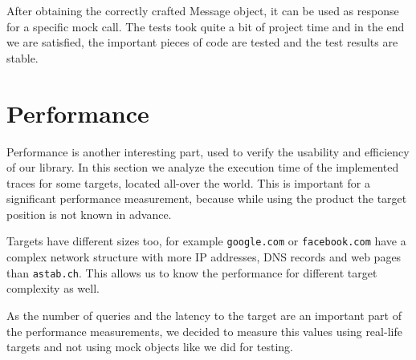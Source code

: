 \documentclass[
	a4paper,					10pt,							twoside,					openright,				notitlepage,			parskip=half,			]{scrreprt}
\begin{document}
After obtaining the correctly crafted Message object, it can be used as response for a specific mock call.
The tests took quite a bit of project time and in the end we are satisfied, the important pieces of code are tested
and the test results are stable.

\section{Performance}
\label{sec:secperf_performance}

Performance is another interesting part, used to verify the usability and efficiency of our library.
In this section we analyze the execution time of the implemented traces for some targets, located all-over the world. 
This is important for a significant performance measurement, because while using the product the target position is
not known in advance.

Targets have different sizes too, for example  \verb|google.com| or \verb|facebook.com| have a complex network structure 
with more \gls{IP} addresses, \gls{DNS} records and web pages than \verb|astab.ch|.
This allows us to know the performance for different target complexity as well.

As the number of queries and the latency to the target are an important part of the performance
measurements, we decided to measure this values using real-life targets and not using mock objects
like we did for testing. 
\end{document}
